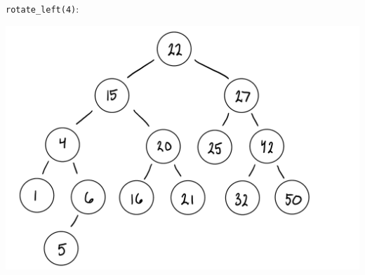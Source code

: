 \documentclass[12pt,twoside]{article}
\begin{document}
\begin{problems}
\begin{problemparts}
    {\tt rotate\_left(4)}:

    \begin{center}
        \includegraphics[scale=0.4]{Images/P1C3.PNG}
    \end{center}

\end{problemparts}

\newpage
\problem

\begin{problemparts}


\end{problemparts}
\end{problems}
\end{document}
